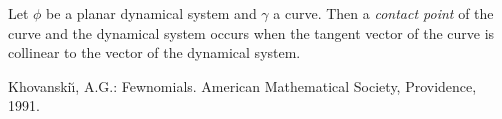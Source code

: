 \documentclass[12pt]{article}
\begin{document}
Let $\phi$ be a planar dynamical system and $\gamma$ a curve.  Then a \emph{contact point} of the curve and the dynamical system occurs when the tangent vector of the curve is collinear to the vector of the dynamical system.
\cite{1}
\begin{thebibliography}{1}
 Khovanski\u\i, A.G.: Fewnomials. American Mathematical Society, Providence, 1991.
\end{thebibliography}
\end{document}

